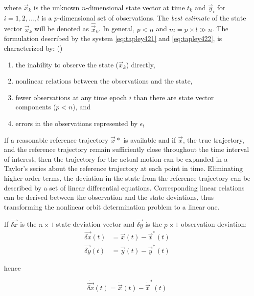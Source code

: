 where \(\vec{x}_k\) is the unknown \(n\)-dimensional state vector at time \(t_k\) and 
\(\vec{y}_i\) for \(i=1,2,\ldots ,l\) is a \(p\)-dimensional set of observations. The 
\emph{best estimate} of the state vector \(\vec{x}_k\) will be denoted as \(\hat{\vec{x}}_k\). 
In general, \(p<n\) and \( m = p \times l \gg n \). The formulation described by the 
system \ref{eq:tapley421} and \ref{eq:tapley422}, is characterized by: (\cite{tapley})
\begin{enumerate}
  \item the inability to observe the state (\(\vec{x}_k\)) directly,
  \item nonlinear relations between the observations and the state, 
  \item fewer observations at any time epoch \(i\) than there are state vector 
  components (\(p<n\)), and 
  \item errors in the observations represented by \({\epsilon}_i\)
\end{enumerate}

If a reasonable reference trajectory \(\vec{x}*\) is available and if 
\(\vec{x}\), the true trajectory, and the reference trajectory remain sufficiently 
close throughout the time interval of interest, then the trajectory for the actual 
motion can be expanded in a Taylor’s series about the reference trajectory at 
each point in time. Eliminating higher order terms, the deviation in the state
from the reference trajectory can be described by a set of linear differential 
equations. Corresponding linear relations can be derived between the observation 
and the state deviations, thus transforming the nonlinear orbit determination problem 
to a linear one.

If \(\vec{\delta x}\) is the \( n \times 1 \) state deviation vector and 
\(\vec{\delta y}\) is the \(p \times 1\) observation deviation:
\begin{equation}
  \begin{aligned}
    \vec{\delta x} (t) &= \vec{x}(t) - \vec{x}^* (t) \\
    \vec{\delta y} (t) &= \vec{y}(t) - \vec{y}^*(t)
  \end{aligned}
\end{equation}

hence

\begin{equation}
  \dot{\vec{\delta x}} (t) = \dot{\vec{x}} (t) - \dot{\vec{x}}^* (t)
\end{equation}

